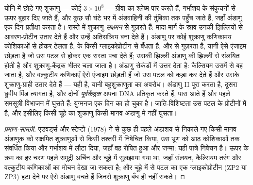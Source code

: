 \begin{proposition}[निषेचन के चरण]\label{prop:b2:mammal-reproduction:fertilisation}
योनि में छोड़े गए शुक्राणु --- कोई $3\times 10^{8}$ --- ग्रीवा का
श्लेष्म पार करते हैं, गर्भाशय के संकुचनों से ऊपर बुहार दिए जाते हैं, और
कुछ सौ घंटे भर में अंडवाहिनी की तुंबिका तक पहुँच जाते हैं, जहाँ
अंडाणु एक दिन प्रतीक्षा करता है। रास्ते में शुक्राणु
\emph{सक्षमन} से गुज़रते हैं: मादा मार्ग के स्राव उनकी
झिल्लियों से आवरण-प्रोटीन उतार देते हैं और उन्हें अतिसक्रिय बना देते
हैं। अंडाणु पर कोई शुक्राणु कणिकामय कोशिकाओं से होकर ठेलता है,
\emph{} के किसी ग्लाइकोप्रोटीन से बँधता है, और
\emph{} से गुज़रता है, यानी ऐसे एंजाइम छोड़ता है जो
उस पटल से होकर एक रास्ता पचा देते हैं; उसकी झिल्ली अंडाणु की झिल्ली से
संलयित होती है और शुक्राणु-केंद्रक भीतर चला जाता है।
अंडाणु सेकंडों में उत्तर देता है: कैल्सियम उसमें से बह जाता है, और
वल्कुटीय कणिकाएँ ऐसे एंजाइम छोड़ती हैं जो उस पटल को कड़ा कर देते हैं और
उसके शुक्राणु-ग्राही उतार देते हैं --- यही \emph{} है,
यानी बहुशुक्राणुता का अवरोध। अंडाणु  II पूरा करता है,
दूसरा ध्रुवीय पिंड त्यागता है, और दोनों  \emph{पूर्वकेंद्रक} अपना
DNA प्रतिकृत करते हैं, पास आते हैं और पहले समसूत्री विभाजन में घुसते
हैं: युग्मनज एक दिन का हो चुका है। जाति-विशिष्टता उस पटल के प्रोटीनों में
है, और इसीलिए किसी चूहे का शुक्राणु किसी मानव अंडाणु में नहीं घुसता।
\end{proposition}
\begin{proof}[प्रमाण-सामग्री]
एडवर्ड्स और स्टेप्टो (1978) ने  से कुछ ही पहले अंडाशय से
निकाले गए किसी मानव अंडाणुक को सक्षमित शुक्राणुओं से किसी तश्तरी में
निषेचित किया, उस भ्रूण को आठ कोशिकाओं तक संवर्धित किया और
गर्भाशय में लौटा दिया, जहाँ वह रोपित हुआ और जन्मा: यही पात्रे निषेचन है।
ऊपर के क्रम का हर चरण पहले समुद्री अर्चिन और चूहे में सुलझाया गया था,
जहाँ संलयन, कैल्सियम तरंग और वल्कुटीय कणिकाओं का मोचन देखा जा सकता है;
और चूहे में  से पटल का एक ग्लाइकोप्रोटीन (ZP2 या ZP3) हटा
देने पर ऐसे अंडाणु बचते हैं जिनसे शुक्राणु बँध ही नहीं सकते।
\end{proof}

